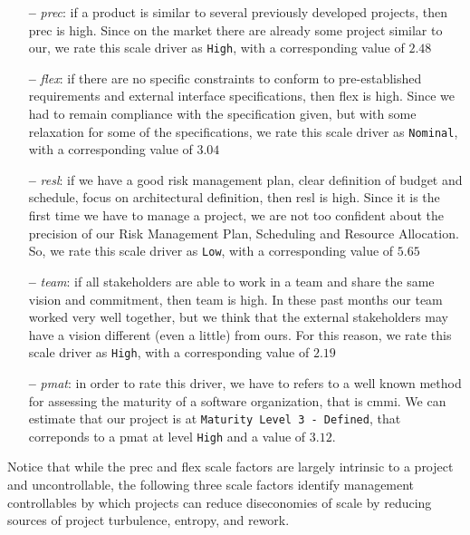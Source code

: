 \begin{itemize}

\item[\textbf{--}] \textit{\acl{prec}}: if a product is similar to several previously developed projects, then \acs{prec} is high. Since on the market there are already some project similar to our, we rate this scale driver as \texttt{High}, with a corresponding value of $2.48$

\item[\textbf{--}] \textit{\acl{flex}}: if there are no specific constraints to conform to pre-established requirements and external interface specifications, then \acs{flex} is high. Since we had to remain compliance with the specification given, but with some relaxation for some of the specifications, we rate this scale driver as \texttt{Nominal}, with a corresponding value of $3.04$

\item[\textbf{--}] \textit{\acl{resl}}: if we have a good risk management plan, clear definition of budget and schedule, focus on architectural definition, then \acs{resl} is high. Since it is the first time we have to manage a project, we are not too confident about the precision of our Risk Management Plan, Scheduling and Resource Allocation. So, we rate this scale driver as \texttt{Low}, with a corresponding value of $5.65$

\item[\textbf{--}] \textit{\acl{team}}: if all stakeholders are able to work in a team and share the same vision and commitment, then \acs{team} is high. In these past months our team worked very well together, but we think that the external stakeholders may have a vision different (even a little) from ours.
For this reason, we rate this scale driver as \texttt{High}, with a corresponding value of $2.19$

\item[\textbf{--}] \textit{\acl{pmat}}: in order to rate this driver, we have to refers to a well known method for assessing the maturity of a software organization, that is \acs{cmmi}. We can estimate that our project is at \texttt{Maturity Level 3 - Defined}, that correponds to a \acs{pmat} at level \texttt{High} and a value of $3.12$.

\end{itemize}

Notice that while the \acs{prec} and \acs{flex} scale factors are largely intrinsic to a project and uncontrollable, the following three scale factors identify management controllables by which projects can reduce diseconomies of scale by reducing sources of project turbulence, entropy, and rework.

